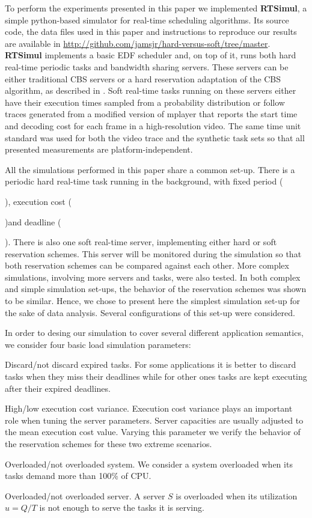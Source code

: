 \documentclass[times, 10pt,twocolumn]{article}
\newcounter{notecounter}
\newcommand{\nota}[1]{\addtocounter{notecounter}{1}{\textcolor{red}{[nota
      \arabic{notecounter}: #1]}}}
\newcommand{\simul}{\textbf{RTSimul}} %
\begin{document}
To perform the experiments presented in this paper we implemented
\simul{}, a simple python-based simulator for real-time scheduling
algorithms. Its source code, the data files used in this paper and
instructions to reproduce our results are available in
\url{http://github.com/jamsjr/hard-versus-soft/tree/master}. \simul{}
implements a basic EDF scheduler and, on top of it, runs both hard
real-time periodic tasks and bandwidth sharing servers. These servers
can be either traditional CBS servers \cite{abeni.ea98:integrating} or
a hard reservation adaptation of the CBS algorithm, as described in
\cite{buttazzo05:soft}. Soft real-time tasks running on these servers
either have their execution times sampled from a probability
distribution or follow traces generated from a modified version of
mplayer that reports the start time and decoding cost for each frame
in a high-resolution video. The same time unit standard was used for
both the video trace and the synthetic task sets so that all presented
measurements are platform-independent.

All the simulations performed in this paper share a common
set-up. There is a periodic hard real-time task running in the
background, with fixed period (\nota{x}), execution cost (\nota{y})and
deadline (\nota{z}).  There is also one soft real-time server,
implementing either hard or soft reservation schemes.  This server
will be monitored during the simulation so that both reservation
schemes can be compared against each other. More complex simulations,
involving more servers and tasks, were also tested. In both complex
and simple simulation set-ups, the behavior of the reservation schemes
was shown to be similar. Hence, we chose to present here the simplest
simulation set-up for the sake of data analysis.  Several
configurations of this set-up were considered.

\label{sec:configurations}

In order to desing our simulation to cover several different
application semantics, we consider four basic load simulation
parameters:
\begin{description}
\item Discard/not discard expired tasks. For some applications it is
  better to discard tasks when they miss their deadlines while for
  other ones tasks are kept executing after their expired deadlines.
\item High/low execution cost variance. Execution cost variance plays
  an important role when tuning the server parameters. Server
  capacities are usually adjusted to the mean execution cost
  value. Varying this parameter we verify the behavior of the
  reservation schemes for these two extreme scenarios.
\item Overloaded/not overloaded system. We consider a system
  overloaded when its tasks demand more than 100\% of CPU.
\item Overloaded/not overloaded server. A server $S$ is overloaded
  when its utilization $u = Q/T$ is not enough to serve the
  tasks it is serving.
\end{description}
\end{document}
